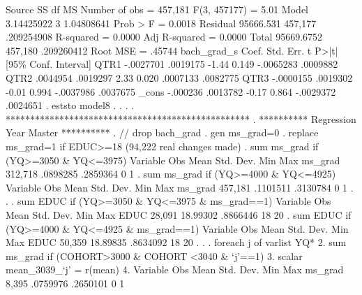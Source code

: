 {\smallskip}
      Source {\VBAR}       SS           df       MS      Number of obs   =   457,181
   F(3, 457177)    =      5.01
       Model {\VBAR}  3.14425922         3  1.04808641   Prob > F        =    0.0018
    Residual {\VBAR}   95666.531   457,177  .209254908   R-squared       =    0.0000
   Adj R-squared   =    0.0000
       Total {\VBAR}  95669.6752   457,180  .209260412   Root MSE        =    .45744
{\smallskip}
 bach_grad_s {\VBAR}      Coef.   Std. Err.      t    P>|t|     [95\% Conf. Interval]
        QTR1 {\VBAR}  -.0027701   .0019175    -1.44   0.149    -.0065283    .0009882
        QTR2 {\VBAR}   .0044954   .0019297     2.33   0.020     .0007133    .0082775
        QTR3 {\VBAR}  -.0000155   .0019302    -0.01   0.994    -.0037986    .0037675
       _cons {\VBAR}   -.000236   .0013782    -0.17   0.864    -.0029372    .0024651
{\smallskip}
. eststo model8
{\smallskip}
. 
. 
. 
. **************************************************
. **********  Regression Year Master **********
. // drop bach_grad
. gen ms_grad=0
{\smallskip}
. replace ms_grad=1 if EDUC>=18
(94,222 real changes made)
{\smallskip}
. sum ms_grad if (YQ>=3050 \& YQ<=3975)
{\smallskip}
    Variable {\VBAR}        Obs        Mean    Std. Dev.       Min        Max
     ms_grad {\VBAR}    312,718    .0898285    .2859364          0          1
{\smallskip}
. sum ms_grad if (YQ>=4000 \& YQ<=4925)
{\smallskip}
    Variable {\VBAR}        Obs        Mean    Std. Dev.       Min        Max
     ms_grad {\VBAR}    457,181    .1101511    .3130784          0          1
{\smallskip}
. 
. 
. sum EDUC if (YQ>=3050 \& YQ<=3975 \& ms_grad==1)
{\smallskip}
    Variable {\VBAR}        Obs        Mean    Std. Dev.       Min        Max
        EDUC {\VBAR}     28,091    18.99302    .8866446         18         20
{\smallskip}
. sum EDUC if (YQ>=4000 \& YQ<=4925 \& ms_grad==1)
{\smallskip}
    Variable {\VBAR}        Obs        Mean    Std. Dev.       Min        Max
        EDUC {\VBAR}     50,359    18.89835    .8634092         18         20
{\smallskip}
. 
. 
. foreach j of varlist YQ* {\lbr}
  2.                 sum ms_grad if (COHORT>3000 \& COHORT <3040 \& `j'==1)
  3.                 scalar mean_3039_`j' = r(mean)
  4. {\rbr}       
{\smallskip}
    Variable {\VBAR}        Obs        Mean    Std. Dev.       Min        Max
     ms_grad {\VBAR}      8,395    .0759976    .2650101          0          1
